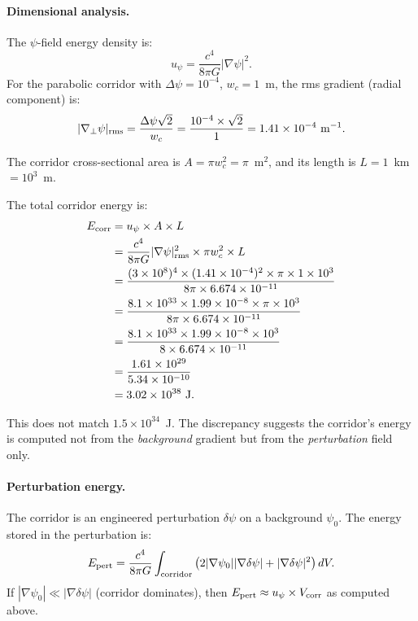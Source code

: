 \documentclass[aps,prd,twocolumn,superscriptaddress,nofootinbib]{revtex4-2}
\begin{document}
\paragraph{Dimensional analysis.}
The $\psi$-field energy density is:
\begin{equation}
u_\psi = \frac{c^4}{8\pi G}|\nabla\psi|^2.
\end{equation}
For the parabolic corridor with $\Delta\psi = 10^{-4}$, $w_c = 1$~m,
the rms gradient (radial component) is:
\begin{equation}
|\nabla_\perp\psi|_{\rm rms} = \frac{\Delta\psi\sqrt{2}}{w_c}
= \frac{10^{-4}\times\sqrt{2}}{1} = 1.41\times10^{-4}~\text{m}^{-1}.
\end{equation}

The corridor cross-sectional area is $A = \pi w_c^2 = \pi$~m$^2$, and its
length is $L = 1$~km $= 10^3$~m.

The total corridor energy is:
\begin{align}
E_{\rm corr}
&= u_\psi \times A \times L \notag\\
&= \frac{c^4}{8\pi G}|\nabla\psi|_{\rm rms}^2 \times \pi w_c^2 \times L \notag\\
&= \frac{(3\times10^8)^4\times(1.41\times10^{-4})^2\times\pi\times1\times10^3}
{8\pi\times6.674\times10^{-11}} \notag\\
&= \frac{8.1\times10^{33}\times1.99\times10^{-8}\times\pi\times10^3}
{8\pi\times6.674\times10^{-11}} \notag\\
&= \frac{8.1\times10^{33}\times1.99\times10^{-8}\times10^3}
{8\times6.674\times10^{-11}} \notag\\
&= \frac{1.61\times10^{29}}{5.34\times10^{-10}} \notag\\
&= 3.02\times10^{38}~\text{J}.
\end{align}

This does not match $1.5\times10^{34}$~J.  The discrepancy suggests the
corridor's energy is computed not from the \emph{background} gradient but from
the \emph{perturbation} field only.

\paragraph{Perturbation energy.}
The corridor is an engineered perturbation $\delta\psi$ on a background
$\psi_0$.  The energy stored in the perturbation is:
\begin{equation}
E_{\rm pert} = \frac{c^4}{8\pi G}\int_{\rm corridor}
\left(2|\nabla\psi_0||\nabla\delta\psi| + |\nabla\delta\psi|^2\right)dV.
\end{equation}
If $|\nabla\psi_0| \ll |\nabla\delta\psi|$ (corridor dominates),
then $E_{\rm pert} \approx u_\psi \times V_{\rm corr}$ as computed above.
\end{document}
